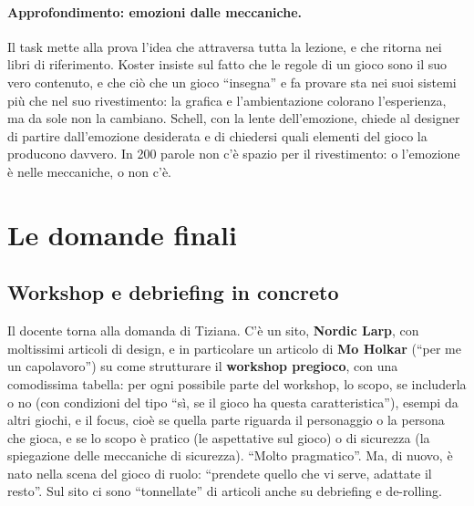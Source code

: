 \paragraph{Approfondimento: emozioni dalle meccaniche.} Il task mette alla prova l'idea
che attraversa tutta la lezione, e che ritorna nei libri di riferimento. Koster
insiste sul fatto che le regole di un gioco sono il suo vero contenuto, e che ciò che
un gioco ``insegna'' e fa provare sta nei suoi sistemi più che nel suo rivestimento:
la grafica e l'ambientazione colorano l'esperienza, ma da sole non la cambiano. Schell, con la lente dell'emozione, chiede al designer di
partire dall'emozione desiderata e di chiedersi quali elementi del gioco la producono
davvero. In 200 parole non c'è spazio per il rivestimento: o l'emozione è nelle
meccaniche, o non c'è.

\section{Le domande finali}
\label{a5:sec:domande}

\subsection{Workshop e debriefing in concreto}

Il docente torna alla domanda di Tiziana. C'è un sito, \textbf{Nordic Larp}, con
moltissimi articoli di design, e in particolare un articolo di \textbf{Mo Holkar}
(``per me un capolavoro'') su come strutturare il \textbf{workshop pregioco}, con una
comodissima tabella: per ogni possibile parte del workshop, lo scopo, se includerla
o no (con condizioni del tipo ``sì, se il gioco ha questa caratteristica''), esempi da
altri giochi, e il focus, cioè se quella parte riguarda il personaggio o la persona
che gioca, e se lo scopo è pratico (le aspettative sul gioco) o di sicurezza (la
spiegazione delle meccaniche di sicurezza). ``Molto pragmatico''. Ma, di nuovo, è nato
nella scena del gioco di ruolo: ``prendete quello che vi serve, adattate il resto''.
Sul sito ci sono ``tonnellate'' di articoli anche su debriefing e de-rolling.

